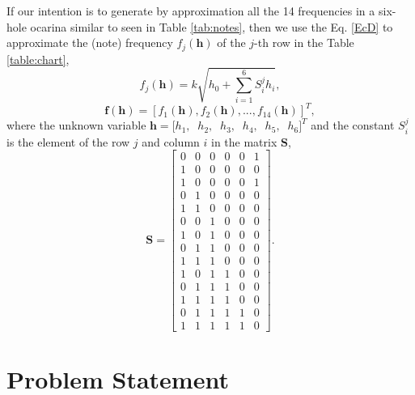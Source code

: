 \documentclass[11pt,twocolumn]{article}
\begin{document}
If our intention is to generate by approximation all the 14 frequencies in a six-hole ocarina
similar to seen in Table \ref{tab:notes}, then we 
use the Eq. \ref{EcD} to approximate the (note) frequency $f_j(\mathbf{h})$ of the $j$-th row in the Table \ref{table:chart},
\begin{equation} \label{EcDbh}
f_j(\mathbf{h}) = k \sqrt{h_0 +\sum_{i=1}^{6}{S^{j}_{i} h_i}},
\end{equation}
\begin{equation} \label{EcDbvech}
\mathbf{f}(\mathbf{h})=\left[f_1(\mathbf{h}), f_2(\mathbf{h}), ..., f_{14}(\mathbf{h})\right]^{T},
\end{equation}
where the unknown variable $\mathbf{h}=[h_{1},$ $~h_{2},$ $~h_{3},$ $~h_{4},$ $~h_{5},$ $~h_{6}]^T$
and 
the constant $S_{i}^{j}$ is the element of the row $j$ and column $i$ in the matrix $\mathbf{S}$,
\begin{equation}
 \mathbf{S}=
\begin{bmatrix}
0 & 0 & 0 & 0 & 0 & 1 \\
1 & 0 & 0 & 0 & 0 & 0 \\
1 & 0 & 0 & 0 & 0 & 1 \\
0 & 1 & 0 & 0 & 0 & 0 \\ 
1 & 1 & 0 & 0 & 0 & 0 \\ 
0 & 0 & 1 & 0 & 0 & 0 \\
1 & 0 & 1 & 0 & 0 & 0 \\ 
0 & 1 & 1 & 0 & 0 & 0 \\ 
1 & 1 & 1 & 0 & 0 & 0 \\ 
1 & 0 & 1 & 1 & 0 & 0 \\ 
0 & 1 & 1 & 1 & 0 & 0 \\ 
1 & 1 & 1 & 1 & 0 & 0 \\
0 & 1 & 1 & 1 & 1 & 0 \\
1 & 1 & 1 & 1 & 1 & 0 
\end{bmatrix}.
\end{equation}



\section{Problem Statement}
\end{document}
